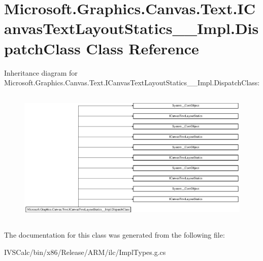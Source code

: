 \hypertarget{class_microsoft_1_1_graphics_1_1_canvas_1_1_text_1_1_i_canvas_text_layout_statics_____impl_1_1_dispatch_class}{}\section{Microsoft.\+Graphics.\+Canvas.\+Text.\+I\+Canvas\+Text\+Layout\+Statics\+\_\+\+\_\+\+Impl.\+Dispatch\+Class Class Reference}
\label{class_microsoft_1_1_graphics_1_1_canvas_1_1_text_1_1_i_canvas_text_layout_statics_____impl_1_1_dispatch_class}
Inheritance diagram for Microsoft.\+Graphics.\+Canvas.\+Text.\+I\+Canvas\+Text\+Layout\+Statics\+\_\+\+\_\+\+Impl.\+Dispatch\+Class\+:\begin{figure}[H]
\begin{center}
\leavevmode
\includegraphics[height=6.553191cm]{class_microsoft_1_1_graphics_1_1_canvas_1_1_text_1_1_i_canvas_text_layout_statics_____impl_1_1_dispatch_class}
\end{center}
\end{figure}


The documentation for this class was generated from the following file\+:\begin{DoxyCompactItemize}
\item 
I\+V\+S\+Calc/bin/x86/\+Release/\+A\+R\+M/ilc/Impl\+Types.\+g.\+cs\end{DoxyCompactItemize}
